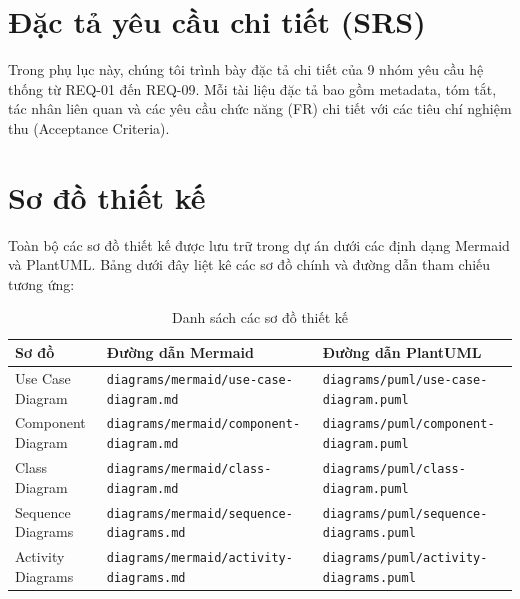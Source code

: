 \appendix

\chapter{Đặc tả yêu cầu chi tiết (SRS)}
\label{ch:appendix_srs}

Trong phụ lục này, chúng tôi trình bày đặc tả chi tiết của 9 nhóm yêu cầu hệ thống từ REQ-01 đến REQ-09. Mỗi tài liệu đặc tả bao gồm metadata, tóm tắt, tác nhân liên quan và các yêu cầu chức năng (FR) chi tiết với các tiêu chí nghiệm thu (Acceptance Criteria).

\newpage
\label{sec:appendix_req01}


\newpage
\label{sec:appendix_req02}


\newpage
\label{sec:appendix_req03}


\newpage
\label{sec:appendix_req04}


\newpage
\label{sec:appendix_req05}


\newpage
\label{sec:appendix_req06}


\newpage
\label{sec:appendix_req07}


\newpage
\label{sec:appendix_req08}


\newpage
\label{sec:appendix_req09}



\chapter{Sơ đồ thiết kế}
\label{ch:appendix_diagrams}

Toàn bộ các sơ đồ thiết kế được lưu trữ trong dự án dưới các định dạng Mermaid và PlantUML. Bảng dưới đây liệt kê các sơ đồ chính và đường dẫn tham chiếu tương ứng:

\begin{table}[htbp]
\centering
\begin{tabularx}{\textwidth}{|l|X|l|}
\hline
\textbf{Sơ đồ} & \textbf{Đường dẫn Mermaid} & \textbf{Đường dẫn PlantUML} \\ \hline
Use Case Diagram & \texttt{diagrams/mermaid/use-case-diagram.md} & \texttt{diagrams/puml/use-case-diagram.puml} \\ \hline
Component Diagram & \texttt{diagrams/mermaid/component-diagram.md} & \texttt{diagrams/puml/component-diagram.puml} \\ \hline
Class Diagram & \texttt{diagrams/mermaid/class-diagram.md} & \texttt{diagrams/puml/class-diagram.puml} \\ \hline
Sequence Diagrams & \texttt{diagrams/mermaid/sequence-diagrams.md} & \texttt{diagrams/puml/sequence-diagrams.puml} \\ \hline
Activity Diagrams & \texttt{diagrams/mermaid/activity-diagrams.md} & \texttt{diagrams/puml/activity-diagrams.puml} \\ \hline
\end{tabularx}
\caption{Danh sách các sơ đồ thiết kế}
\label{tab:design_diagrams_list}
\end{table}


